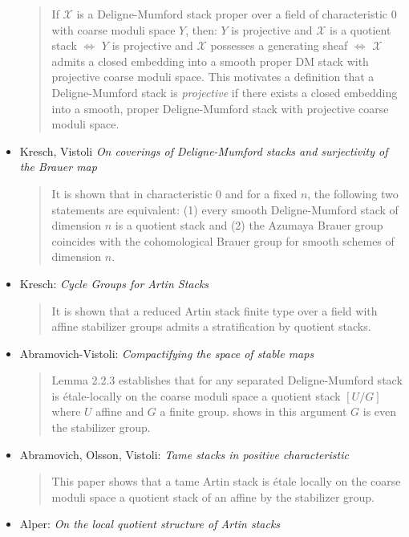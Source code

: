 \begin{itemize}
\begin{quote}
If $\mathcal{X}$ is a Deligne-Mumford stack proper over a field of
characteristic 0
with coarse moduli space $Y$, then: $Y$ is projective and $\mathcal{X}$ is a
quotient
stack $\iff$ $Y$ is projective and $\mathcal{X}$ possesses a generating sheaf
$\iff$
$\mathcal{X}$ admits a closed embedding into a smooth proper DM stack with
projective
coarse moduli space. This motivates a definition that a Deligne-Mumford stack
is \emph{projective} if there exists a closed embedding into a smooth, proper
Deligne-Mumford stack with projective coarse moduli space.
\end{quote}
\item Kresch, Vistoli \emph{On coverings of Deligne-Mumford stacks and
surjectivity of the Brauer map} \cite{kresch-vistoli}
\begin{quote}
It is shown that in characteristic 0 and for a fixed $n$, the following two
statements are equivalent: (1) every smooth Deligne-Mumford stack of dimension
$n$ is a quotient stack and (2) the Azumaya Brauer group coincides with the
cohomological Brauer group for smooth schemes of dimension $n$.
\end{quote}
\item Kresch: \emph{Cycle Groups for Artin Stacks} \cite{kresch_cycle}
\begin{quote}
It is shown that a reduced Artin stack finite type over a field with affine
stabilizer groups admits a stratification by quotient stacks.
\end{quote}
\item Abramovich-Vistoli:
\emph{Compactifying the space of stable maps} \cite{abramovich-vistoli}
\begin{quote}
Lemma 2.2.3 establishes that for any separated Deligne-Mumford stack is
\'etale-locally on the coarse moduli space a quotient stack $[U/G]$ where $U$
affine and $G$ a finite group. \cite[Theorem 2.12]{olsson_homstacks} shows in
this argument $G$ is even the stabilizer group.
\end{quote}
\item Abramovich, Olsson, Vistoli:
\emph{Tame stacks in positive characteristic} \cite{tame}
\begin{quote}
This paper shows that a tame Artin stack is \'etale locally on the coarse
moduli space a quotient stack of an affine by the stabilizer group.
\end{quote}
\item Alper: \emph{On the local quotient structure of Artin stacks}
\cite{alper_quotient}
\begin{quote}

\end{quote}
\end{itemize}
